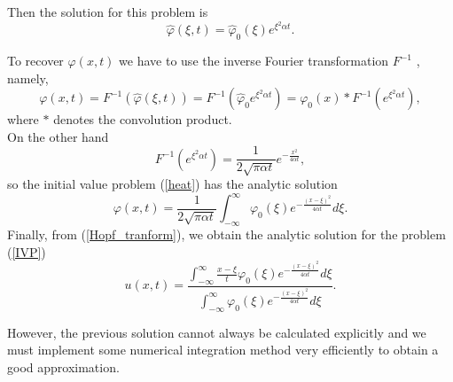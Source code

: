     \noindent Then the solution for this problem is
    \begin{equation*}
         \hat{\varphi} (\xi, t) =  \hat{\varphi}_0 (\xi) e^{ \xi^2 \alpha t}.
    \end{equation*}
    
    \noindent To recover $\varphi (x, t)$ we have to use the inverse Fourier transformation $F^{-1}$ , namely,
    \begin{equation*}
        \varphi (x, t) = F^{-1} (\hat{\varphi} (\xi, t)) = F^{-1} (\hat{\varphi}_0 e^{\xi^2 \alpha t}) = \varphi_0 (x) \ast F^{-1} (e^{\xi^2 \alpha t}),
    \end{equation*}
    where $\ast$ denotes the convolution product.\\
    
    \noindent On the other hand
    \begin{equation*}
        F^{-1} (e^{\xi^2 \alpha t}) = \frac{1}{2 \sqrt{\pi \alpha t}} e^{- \frac{x^2}{4 \alpha t}},
    \end{equation*}
    so the initial value problem (\ref{heat}) has the analytic solution
    \begin{equation*}
        \varphi (x, t) = \frac{1}{2 \sqrt{\pi \alpha t}} \displaystyle \int_{-\infty}^{\infty} \varphi_0 (\xi) e^{- \frac{(x - \xi)^2}{4 \alpha t}} d\xi.
    \end{equation*}
    Finally, from (\ref{Hopf_tranform}), we obtain the analytic solution for the problem (\ref{IVP})
    \begin{equation}
    \label{Exact_Solution}
        u (x, t) =  \displaystyle \frac{\int_{-\infty}^{\infty} \frac{x - \xi}{t} \varphi_0 (\xi) e^{- \frac{(x - \xi)^2}{4 \alpha t}} d\xi}{\int_{-\infty}^{\infty} \varphi_0 (\xi) e^{- \frac{(x - \xi)^2}{4 \alpha t}} d\xi}. 
    \end{equation}
    
    However, the previous solution cannot always be calculated explicitly and we must implement some numerical integration method very efficiently to obtain a good approximation.
    
